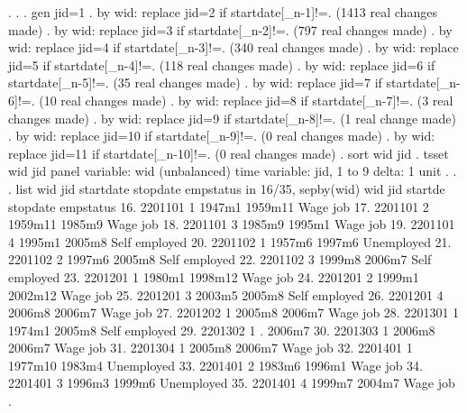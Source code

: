 . 
. 
. gen jid=1
{\smallskip}
. by wid: replace jid=2 if startdate[_n-1]!=.
(1413 real changes made)
{\smallskip}
. by wid: replace jid=3 if startdate[_n-2]!=.
(797 real changes made)
{\smallskip}
. by wid: replace jid=4 if startdate[_n-3]!=.
(340 real changes made)
{\smallskip}
. by wid: replace jid=5 if startdate[_n-4]!=.
(118 real changes made)
{\smallskip}
. by wid: replace jid=6 if startdate[_n-5]!=.
(35 real changes made)
{\smallskip}
. by wid: replace jid=7 if startdate[_n-6]!=.
(10 real changes made)
{\smallskip}
. by wid: replace jid=8 if startdate[_n-7]!=.
(3 real changes made)
{\smallskip}
. by wid: replace jid=9 if startdate[_n-8]!=.
(1 real change made)
{\smallskip}
. by wid: replace jid=10 if startdate[_n-9]!=.
(0 real changes made)
{\smallskip}
. by wid: replace jid=11 if startdate[_n-10]!=.
(0 real changes made)
{\smallskip}
. sort wid jid
{\smallskip}
. tsset wid jid
       panel variable:  wid (unbalanced)
        time variable:  jid, 1 to 9
                delta:  1 unit
{\smallskip}
. 
. 
. list wid jid startdate stopdate empstatus in 16/35, sepby(wid)
{\smallskip}
     {\TLC}
     {\VBAR}     wid   jid   startd{\tytilde}e   stopdate       empstatus {\VBAR}
     {\LFTT}
 16. {\VBAR} 2201101     1     1947m1    1959m11        Wage job {\VBAR}
 17. {\VBAR} 2201101     2    1959m11     1985m9        Wage job {\VBAR}
 18. {\VBAR} 2201101     3     1985m9     1995m1        Wage job {\VBAR}
 19. {\VBAR} 2201101     4     1995m1     2005m8   Self employed {\VBAR}
     {\LFTT}
 20. {\VBAR} 2201102     1     1957m6     1997m6      Unemployed {\VBAR}
 21. {\VBAR} 2201102     2     1997m6     2005m8   Self employed {\VBAR}
 22. {\VBAR} 2201102     3     1999m8     2006m7   Self employed {\VBAR}
     {\LFTT}
 23. {\VBAR} 2201201     1     1980m1    1998m12        Wage job {\VBAR}
 24. {\VBAR} 2201201     2     1999m1    2002m12        Wage job {\VBAR}
 25. {\VBAR} 2201201     3     2003m5     2005m8   Self employed {\VBAR}
 26. {\VBAR} 2201201     4     2006m8     2006m7        Wage job {\VBAR}
     {\LFTT}
 27. {\VBAR} 2201202     1     2005m8     2006m7        Wage job {\VBAR}
     {\LFTT}
 28. {\VBAR} 2201301     1     1974m1     2005m8   Self employed {\VBAR}
     {\LFTT}
 29. {\VBAR} 2201302     1          .     2006m7                 {\VBAR}
     {\LFTT}
 30. {\VBAR} 2201303     1     2006m8     2006m7        Wage job {\VBAR}
     {\LFTT}
 31. {\VBAR} 2201304     1     2005m8     2006m7        Wage job {\VBAR}
     {\LFTT}
 32. {\VBAR} 2201401     1    1977m10     1983m4      Unemployed {\VBAR}
 33. {\VBAR} 2201401     2     1983m6     1996m1        Wage job {\VBAR}
 34. {\VBAR} 2201401     3     1996m3     1999m6      Unemployed {\VBAR}
 35. {\VBAR} 2201401     4     1999m7     2004m7        Wage job {\VBAR}
     {\BLC}
{\smallskip}
. 
